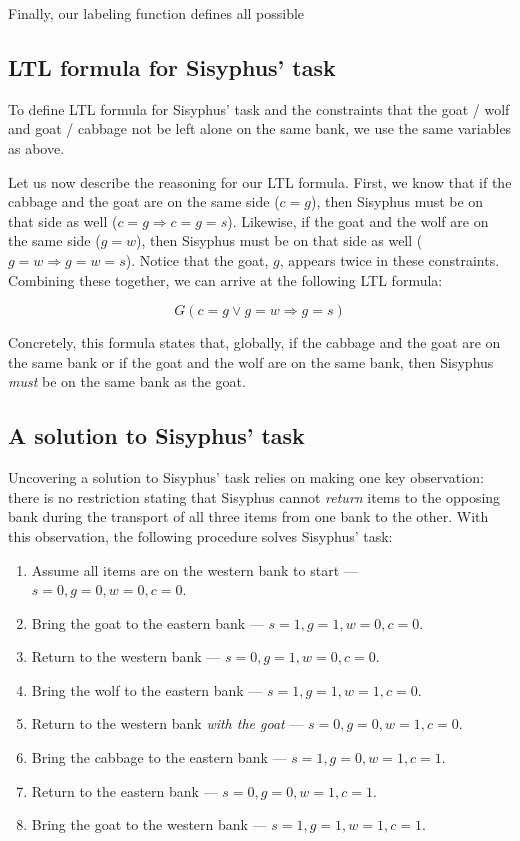 \documentclass{article}
\begin{document}
Finally, our labeling function defines all possible

\subsection{LTL formula for Sisyphus' task}

To define LTL formula for Sisyphus' task and the constraints that the goat / wolf and goat / cabbage not be left alone on the same bank, we use the same variables as above.

Let us now describe the reasoning for our LTL formula. First, we know that if the cabbage and the goat are on the same side ($c = g$), then Sisyphus must be on that side as well ($c = g \Longrightarrow c = g = s$). Likewise, if the goat and the wolf are on the same side ($g = w$), then Sisyphus must be on that side as well ($g = w \Longrightarrow g = w = s$). Notice that the goat, $g$, appears twice in these constraints. Combining these together, we can arrive at the following LTL formula:

$$
G(c = g \lor g = w \Longrightarrow g = s)
$$

Concretely, this formula states that, globally, if the cabbage and the goat are on the same bank or if the goat and the wolf are on the same bank, then Sisyphus \emph{must} be on the same bank as the goat.

\subsection{A solution to Sisyphus' task}

Uncovering a solution to Sisyphus' task relies on making one key observation: there is no restriction stating that Sisyphus cannot \emph{return} items to the opposing bank during the transport of all three items from one bank to the other. With this observation, the following procedure solves Sisyphus' task:

\begin{enumerate}
  \item Assume all items are on the western bank to start — $s = 0, g = 0, w = 0, c = 0$.
  \item Bring the goat to the eastern bank — $s = 1, g = 1, w = 0, c = 0$.
  \item Return to the western bank — $s = 0, g = 1, w = 0, c = 0$.
  \item Bring the wolf to the eastern bank — $s = 1, g = 1, w = 1, c = 0$.
  \item Return to the western bank \emph{with the goat} — $s = 0, g = 0, w = 1, c = 0$.
  \item Bring the cabbage to the eastern bank — $s = 1, g = 0, w = 1, c = 1$.
  \item Return to the eastern bank — $s = 0, g = 0, w = 1, c = 1$.
  \item Bring the goat to the western bank — $s = 1, g = 1, w = 1, c = 1$.
\end{enumerate}
\end{document}
